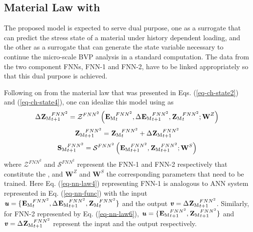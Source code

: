 \subsection{Material Law with \fnn}\label{nn-fnn2-material}
The proposed \fnn model is expected to serve dual purpose, one as a surrogate that can predict the stress state of a material under history dependent loading, and the other as a surrogate that can generate the state variable necessary to continue the micro-scale BVP analysis in a standard \fee computation. The data from the two component FNNs, \mbox{FNN-1} and \mbox{FNN-2}, have to be linked appropriately so that this dual purpose is achieved.

Following on from the material law that was presented in Eqs. (\ref{eq-ch-state2}) and (\ref{eq-ch-state4}), one can idealize this model using \fnn as
\begin{equation}\label{eq-nn-law4}
\Delta{\tgm[]{Z}}^{FNN^2}_{t+1}=\mathcal{Z}^{FNN^2}\left({\tgm[]{E}}^{FNN^2}_t,\Delta{\tgm[]{E}}^{FNN^2}_{t+1},{\tgm[]{Z}}^{FNN^2}_t;\textbf{W}^Z\right)
\end{equation}
\begin{equation}\label{eq-nn-law5}
{\tgm[]{Z}}^{FNN^2}_{t+1}={\tgm[]{Z}}^{FNN^2}_{t}+\Delta{\tgm[]{Z}}^{FNN^2}_{t+1}
\end{equation}
\begin{equation}\label{eq-nn-law6}
{\tgm[]{S}}^{FNN^2}_{t+1}=\mathcal{S}^{FNN^2}\left({\tgm[]{E}}^{FNN^2}_{t+1},{\tgm[]{Z}}^{FNN^2}_{t+1};\textbf{W}^S\right)
\end{equation}
where $ \mathcal{Z}^{FNN^2} $ and $ \mathcal{S}^{FNN^2} $ represent the \mbox{FNN-1} and \mbox{FNN-2} respectively that constitute the \fnn, and $ \textbf{W}^Z $ and $ \textbf{W}^S $ the corresponding parameters that need to be trained. Here Eq. (\ref{eq-nn-law4}) representing FNN-1 is analogous to ANN system represented in Eq. (\ref{eq-nn-func}) with the input $ \textbf{\textit{u}}=\{{\tgm[]{E}}^{FNN^2}_t,\Delta{\tgm[]{E}}^{FNN^2}_{t+1},{\tgm[]{Z}}^{FNN^2}_t\} $ and the output $ \textbf{\textit{v}}=\Delta{\tgm[]{Z}}^{FNN^2}_{t+1} $. Similarly, for FNN-2 represented by Eq. (\ref{eq-nn-law6}), $ \textbf{\textit{u}}=\{{\tgm[]{E}}^{FNN^2}_{t+1},{\tgm[]{Z}}^{FNN^2}_{t+1}\} $ and $ \textbf{\textit{v}}=\Delta{\tgm[]{Z}}^{FNN^2}_{t+1} $ represent the input and the output respectively.

